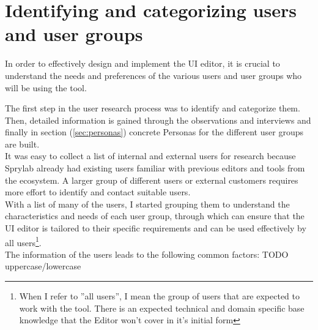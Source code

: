 \section{Identifying and categorizing users and user groups}
\label{sec:user-groups}
In order to effectively design and implement the UI editor, it is crucial to understand the needs and preferences of the various users and user groups who will be using the tool.

The first step in the user research process was to identify and categorize them.
Then, detailed information is gained through the observations and interviews and finally in section (\ref{sec:personas}) concrete Personas for the different user groups are built.
\\
It was easy to collect a list of internal and external users for research because Sprylab already had existing users familiar with previous editors and tools from the ecosystem.
A larger group of different users or external customers requires more effort to identify and contact suitable users.
\\
With a list of many of the users, I started grouping them to understand the characteristics and needs of each user group, through which can ensure that the UI editor is tailored to their specific requirements and can be used effectively by all users\footnote{When I refer to ''all users'', I mean the group of users that are expected to work with the tool. There is an expected technical and domain specific base knowledge that the Editor won't cover in it's initial form}.
\\
The information of the users leads to the following common factors:
TODO uppercase/lowercase
